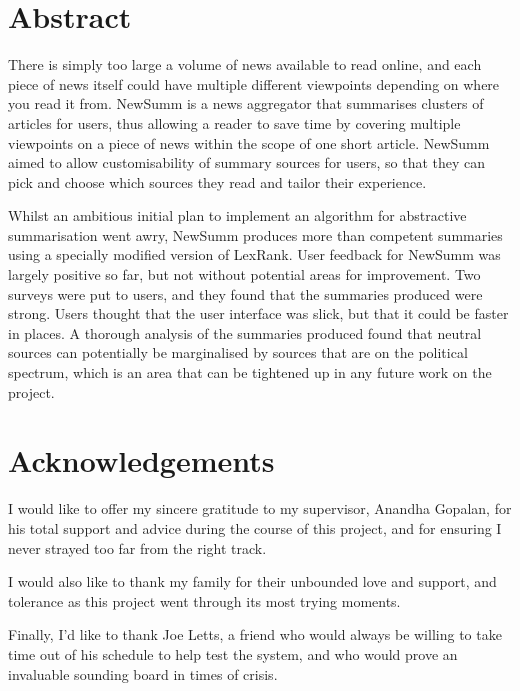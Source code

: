 \documentclass[12pt]{article}
\begin{document}

\section*{Abstract}

There is simply too large a volume of news available to read online, and each piece of news itself could have multiple different viewpoints depending on where you read it from. NewSumm is a news aggregator that summarises clusters of articles for users, thus allowing a reader to save time by covering multiple viewpoints on a piece of news within the scope of one short article. NewSumm aimed to allow customisability of summary sources for users, so that they can pick and choose which sources they read and tailor their experience.

Whilst an ambitious initial plan to implement an algorithm for abstractive summarisation went awry, NewSumm produces more than competent summaries using a specially modified version of LexRank. User feedback for NewSumm was largely positive so far, but not without potential areas for improvement. Two surveys were put to users, and they found that the summaries produced were strong. Users thought that the user interface was slick, but that it could be faster in places. A thorough analysis of the summaries produced found that neutral sources can potentially be marginalised by sources that are on the political spectrum, which is an area that can be tightened up in any future work on the project. 

\pagebreak

\section*{Acknowledgements}

I would like to offer my sincere gratitude to my supervisor, Anandha Gopalan, for his total support and advice during the course of this project, and for ensuring I never strayed too far from the right track.

I would also like to thank my family for their unbounded love and support, and tolerance as this project went through its most trying moments.

Finally, I'd like to thank Joe Letts, a friend who would always be willing to take time out of his schedule to help test the system, and who would prove an invaluable sounding board in times of crisis.
\end{document}
